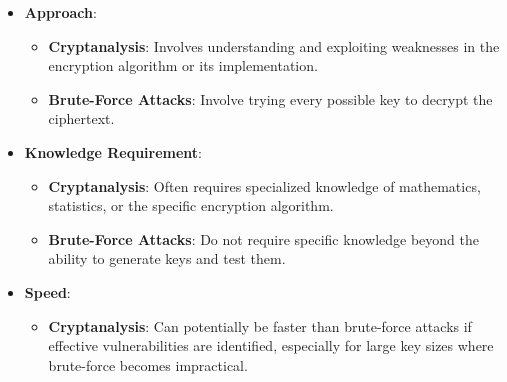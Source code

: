 \documentclass{article}
\begin{document}
                       


                            \begin{itemize}
                                \item \textbf{Approach}:
                                \begin{itemize}
                                    \item \textbf{Cryptanalysis}: Involves understanding and exploiting weaknesses in the encryption algorithm or its implementation.
                                    \item \textbf{Brute-Force Attacks}: Involve trying every possible key to decrypt the ciphertext.
                                \end{itemize}

                                \item \textbf{Knowledge Requirement}:
                                \begin{itemize}
                                    \item \textbf{Cryptanalysis}: Often requires specialized knowledge of mathematics, statistics, or the specific encryption algorithm.
                                    \item \textbf{Brute-Force Attacks}: Do not require specific knowledge beyond the ability to generate keys and test them.
                                \end{itemize}

                                \item \textbf{Speed}:
                                \begin{itemize}
                                    \item \textbf{Cryptanalysis}: Can potentially be faster than brute-force attacks if effective vulnerabilities are identified, especially for large key sizes where brute-force becomes impractical.
                                \end{itemize}
                            \end{itemize}
\end{document}
